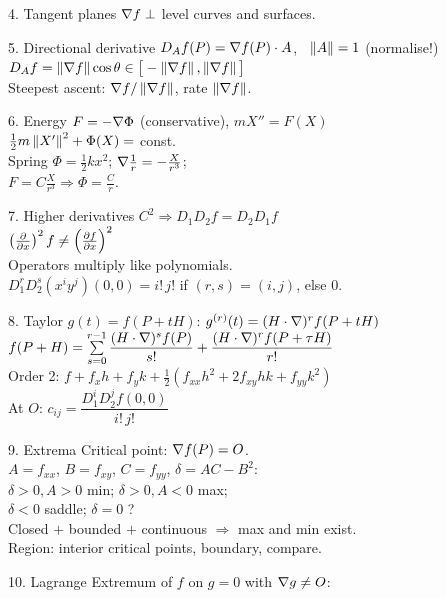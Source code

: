 \begin{tcbraster}[raster columns=2, raster equal height=rows, raster column skip=4mm, raster row skip=4mm]
\begin{fsheet}{4. Tangent planes}
$\nabla f\perp$ level curves and surfaces.
\end{fsheet}
\begin{fsheet}{5. Directional derivative}
$D_Af(P)=\nabla f(P)\cdot A$, \ $\left\lVert A\right\rVert=1$ (normalise!)\\
$D_Af=\left\lVert \nabla f\right\rVert\cos\theta\in\big[-\left\lVert \nabla f\right\rVert,\left\lVert \nabla f\right\rVert\big]$\\
Steepest ascent: $\nabla f/\left\lVert \nabla f\right\rVert$, rate $\left\lVert \nabla f\right\rVert$.
\end{fsheet}
\begin{fsheet}{6. Energy}
$F=-\nabla\Phi$ (conservative), $mX''=F(X)$\\
$\tfrac12m\left\lVert X'\right\rVert^2+\Phi(X)=$ const.\\
Spring $\Phi=\tfrac12kx^2$; $\nabla\frac1r=-\frac{X}{r^3}$;\\ $F=C\frac{X}{r^3}\Rightarrow\Phi=\frac Cr$.
\end{fsheet}
\begin{fsheet}{7. Higher derivatives}
$C^2\Rightarrow D_1D_2f=D_2D_1f$\\
$\left(\frac{\partial }{\partial x}\right)^2f\neq\left(\frac{\partial f}{\partial x}\right)^2$\\
Operators multiply like polynomials.\\
$D_1^rD_2^s(x^iy^j)(0,0)=i!\,j!$ if $(r,s)=(i,j)$, else $0$.
\end{fsheet}
\begin{fsheet}{8. Taylor}
$g(t)=f(P+tH)$: $g^{(r)}(t)=(H\cdot\nabla)^rf(P+tH)$\\[2pt]
$f(P+H)=\sum\limits_{s=0}^{r-1}\dfrac{(H\cdot\nabla)^sf(P)}{s!}+\dfrac{(H\cdot\nabla)^rf(P+\tau H)}{r!}$\\[3pt]
Order 2: $f+f_xh+f_yk+\tfrac12(f_{xx}h^2+2f_{xy}hk+f_{yy}k^2)$\\
At $O$: $c_{ij}=\dfrac{D_1^iD_2^jf(0,0)}{i!\,j!}$
\end{fsheet}
\begin{fsheet}{9. Extrema}
Critical point: $\nabla f(P)=O$.\\
$A=f_{xx}$, $B=f_{xy}$, $C=f_{yy}$, $\delta=AC-B^2$:\\
$\delta>0,A>0$ min; $\delta>0,A<0$ max;\\ $\delta<0$ saddle; $\delta=0$ ?\\
Closed $+$ bounded $+$ continuous $\Rightarrow$ max and min exist.\\
Region: interior critical points, boundary, compare.
\end{fsheet}
\begin{fsheet}{10. Lagrange}
Extremum of $f$ on $g=0$ with $\nabla g\neq O$:\\

\end{fsheet}
\end{tcbraster}

